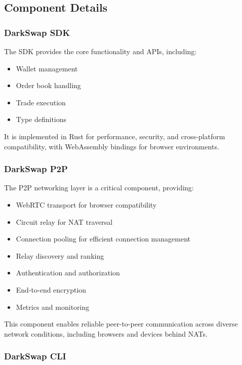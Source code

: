 \documentclass[11pt,a4paper]{article}
\begin{document}
\subsection{Component Details}

\subsubsection{DarkSwap SDK}

The SDK provides the core functionality and APIs, including:

\begin{itemize}
    \item Wallet management
    \item Order book handling
    \item Trade execution
    \item Type definitions
\end{itemize}

It is implemented in Rust for performance, security, and cross-platform compatibility, with WebAssembly bindings for browser environments.

\subsubsection{DarkSwap P2P}

The P2P networking layer is a critical component, providing:

\begin{itemize}
    \item WebRTC transport for browser compatibility
    \item Circuit relay for NAT traversal
    \item Connection pooling for efficient connection management
    \item Relay discovery and ranking
    \item Authentication and authorization
    \item End-to-end encryption
    \item Metrics and monitoring
\end{itemize}

This component enables reliable peer-to-peer communication across diverse network conditions, including browsers and devices behind NATs.

\subsubsection{DarkSwap CLI}
\end{document}
